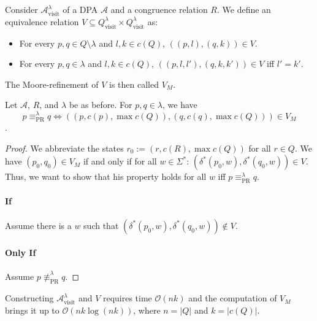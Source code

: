\begin{defn}
	Consider $\mathcal{A}^\lambda_\text{visit}$ of a DPA $\mathcal{A}$ and a congruence relation $R$. We define an equivalence relation $V \subseteq Q^\lambda_\text{visit} \times Q^\lambda_\text{visit}$ as:
	\begin{itemize}
		\item For every $p, q \in Q \setminus \lambda$ and $l, k \in c(Q)$, $((p, l), (q, k)) \in V$.
		\item For every $p, q \in \lambda$ and $l, k \in c(Q)$, $((p, l, l'), (q, k, k')) \in V$ iff $l' = k'$.
	\end{itemize}
	
	The Moore-refinement of $V$ is then called $V_M$.
\end{defn}

\begin{theorem}
	Let $\mathcal{A}$, $R$, and $\lambda$ be as before. For $p, q \in \lambda$, we have $$p \equiv_\text{PR}^\lambda q \Leftrightarrow ((p, c(p), \max c(Q)), (q, c(q), \max c(Q))) \in V_M$$.
\end{theorem}

\begin{proof}
	We abbreviate the states $r_0 := (r, c(R), \max c(Q))$ for all $r \in Q$. We have $(p_0, q_0) \in V_M$ if and only if for all $w \in \Sigma^*$: $(\delta^*(p_0, w), \delta^*(q_0, w)) \in V$. Thus, we want to show that his property holds for all $w$ iff $p \equiv_\text{PR}^\lambda q$.
	
	\paragraph{If} Assume there is a $w$ such that $(\delta^*(p_0, w), \delta^*(q_0, w)) \notin V$. %
	
	\paragraph{Only If} Assume $p \not\equiv_\text{PR}^\lambda q$. %
\end{proof}

Constructing $\mathcal{A}^\lambda_\text{visit}$ and $V$ requires time $\mathcal{O}(nk)$ and the computation of $V_M$ brings it up to $\mathcal{O}(nk \log(nk))$, where $n = |Q|$ and $k = |c(Q)|$.



















